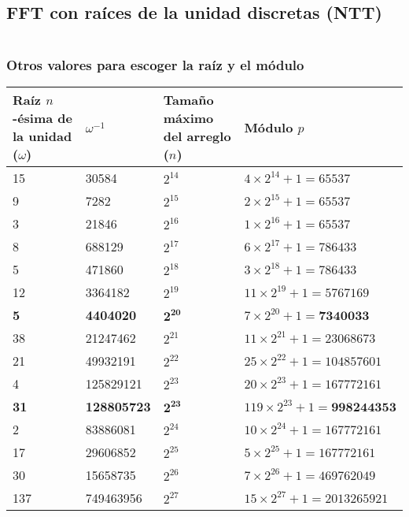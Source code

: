 \documentclass[11pt]{article}
\begin{document}
		\subsection{FFT con raíces de la unidad discretas (NTT)}
		\inputminted[tabsize=2,breaklines,firstline=46,lastline=90,fontsize=\small]{c++}{fft.cpp}
			\subsubsection{Otros valores para escoger la raíz y el módulo}
				\begin{table}[H]
					\centering
					\begin{tabular}{|p{2cm}|p{1.7cm}|p{2cm}|p{4.5cm}|}
						\hline
						Raíz $n$-ésima de la unidad ($\omega$) & $\omega^{-1}$ & Tamaño máximo del arreglo ($n$) & Módulo $p$ \\ \hline
						15 & 30584 & $2^{14}$ & $4 \times 2^{14} + 1 = 65537$ \\ \hline
						9 & 7282 & $2^{15}$ & $2 \times 2^{15} + 1 = 65537$ \\ \hline
						3 & 21846 & $2^{16}$ & $1 \times 2^{16} + 1 = 65537$ \\ \hline
						8 & 688129 & $2^{17}$ & $6 \times 2^{17} + 1 = 786433$ \\ \hline
						5 & 471860 & $2^{18}$ & $3 \times 2^{18} + 1 = 786433$ \\ \hline
						12 & 3364182 & $2^{19}$ & $11 \times 2^{19} + 1 = 5767169$ \\ \hline
						\textbf{5} & \textbf{4404020} & $\mathbf{2^{20}}$ & $7 \times 2^{20} + 1 = \textbf{7340033}$ \\ \hline
						38 & 21247462 & $2^{21}$ & $11 \times 2^{21} + 1 = 23068673$ \\ \hline
						21 & 49932191 & $2^{22}$ & $25 \times 2^{22} + 1 = 104857601$ \\ \hline
						4 & 125829121 & $2^{23}$ & $20 \times 2^{23} + 1 = 167772161$ \\ \hline
						\textbf{31} & \textbf{128805723} & $\mathbf{2^{23}}$ & $119 \times 2^{23} + 1 = \textbf{998244353}$ \\ \hline
						2 & 83886081 & $2^{24}$ & $10 \times 2^{24} + 1 = 167772161$ \\ \hline
						17 & 29606852 & $2^{25}$ & $5 \times 2^{25} + 1 = 167772161$ \\ \hline
						30 & 15658735 & $2^{26}$ & $7 \times 2^{26} + 1 = 469762049$ \\ \hline
						137 & 749463956 & $2^{27}$ & $15 \times 2^{27} + 1 = 2013265921$ \\ \hline
					\end{tabular}
				\end{table}
		
\end{document}
